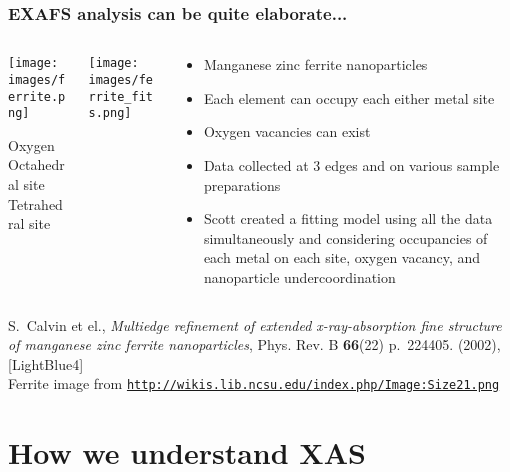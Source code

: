\documentclass[10pt, xcolor=x11names, compress]{beamer}
\begin{document}
\begin{frame}
  \frametitle{EXAFS analysis can be quite elaborate...}
  \begin{columns}[T]
    \begin{column}{0.2\linewidth}
      \texttt{[image: images/ferrite.png]}
      \begin{center}
        {\color{Blue3}Oxygen}\\{\color{Green3}Octahedral site}
        \\{\color{Red3}Tetrahedral site}
      \end{center}
    \end{column}
    \begin{column}{0.3\linewidth}
      \texttt{[image: images/ferrite\_fits.png]}
    \end{column}
    \begin{column}{0.5\linewidth}
      \begin{itemize}
      \item Manganese zinc ferrite nanoparticles
      \item Each element can occupy each either metal site
      \item Oxygen vacancies can exist
      \item Data collected at 3 edges and on various sample
        preparations
      \item Scott created a fitting model using all the data
        simultaneously and considering occupancies of each metal on
        each site, oxygen vacancy, and nanoparticle undercoordination
      \end{itemize}
    \end{column}
  \end{columns}
  \begin{bottomnote}[0.7][18.75]
    S.\ Calvin et el., \textit{Multiedge refinement of extended
      x-ray-absorption fine structure of manganese zinc ferrite
      nanoparticles}, Phys. Rev. B \textbf{66}(22) p.~224405. (2002),
    [LightBlue4]\\
    Ferrite image from
    \href{http://wikis.lib.ncsu.edu/index.php/Image:Size21.png}
    {\color{LightBlue4}{\ComputerMouse~}\texttt{http://wikis.lib.ncsu.edu/index.php/Image:Size21.png}}
  \end{bottomnote}
\end{frame}

\section{How we understand XAS}
\end{document}
